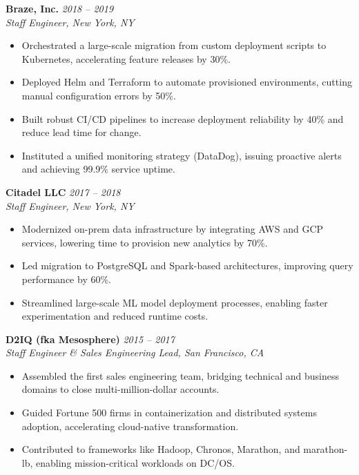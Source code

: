 \documentclass[margin,line]{resume}
\begin{document}
\begin{resume}
\textbf{Braze, Inc.} \hfill \textit{2018 -- 2019}\\
\textit{Staff Engineer, New York, NY}
\begin{itemize}[leftmargin=0.5cm]
    \item Orchestrated a large-scale migration from custom deployment scripts to Kubernetes, accelerating feature releases by 30\%.
    \item Deployed Helm and Terraform to automate provisioned environments, cutting manual configuration errors by 50\%.
    \item Built robust CI/CD pipelines to increase deployment reliability by 40\% and reduce lead time for change.
    \item Instituted a unified monitoring strategy (DataDog), issuing proactive alerts and achieving 99.9\% service uptime.
\end{itemize}

\textbf{Citadel LLC} \hfill \textit{2017 -- 2018}\\
\textit{Staff Engineer, New York, NY}
\begin{itemize}[leftmargin=0.5cm]
    \item Modernized on-prem data infrastructure by integrating AWS and GCP services, lowering time to provision new analytics by 70\%.
    \item Led migration to PostgreSQL and Spark-based architectures, improving query performance by 60\%.
    \item Streamlined large-scale ML model deployment processes, enabling faster experimentation and reduced runtime costs.
\end{itemize}

\textbf{D2IQ (fka Mesosphere)} \hfill \textit{2015 -- 2017}\\
\textit{Staff Engineer \& Sales Engineering Lead, San Francisco, CA}
\begin{itemize}[leftmargin=0.5cm]
    \item Assembled the first sales engineering team, bridging technical and business domains to close multi-million-dollar accounts.
    \item Guided Fortune 500 firms in containerization and distributed systems adoption, accelerating cloud-native transformation.
    \item Contributed to frameworks like Hadoop, Chronos, Marathon, and marathon-lb, enabling mission-critical workloads on DC/OS.
\end{itemize}


\end{resume}
\end{document}

